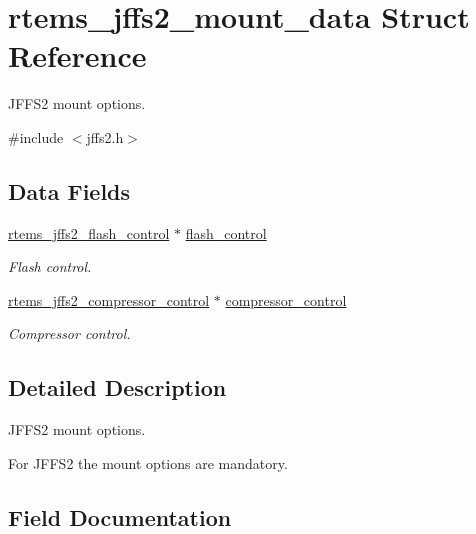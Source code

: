 \hypertarget{structrtems__jffs2__mount__data}{}\section{rtems\+\_\+jffs2\+\_\+mount\+\_\+data Struct Reference}
\label{structrtems__jffs2__mount__data}


J\+F\+F\+S2 mount options.  




{\ttfamily \#include $<$jffs2.\+h$>$}

\subsection*{Data Fields}
\begin{DoxyCompactItemize}
\item 
\mbox{\label{structrtems__jffs2__mount__data_a999ba6b5fd33ad5f0c77b9805e102bf5}} 
\mbox{\hyperlink{structrtems__jffs2__flash__control}{rtems\+\_\+jffs2\+\_\+flash\+\_\+control}} $\ast$ \mbox{\hyperlink{structrtems__jffs2__mount__data_a999ba6b5fd33ad5f0c77b9805e102bf5}{flash\+\_\+control}}
\begin{DoxyCompactList}\small\item\em Flash control. \end{DoxyCompactList}\item 
\mbox{\hyperlink{structrtems__jffs2__compressor__control}{rtems\+\_\+jffs2\+\_\+compressor\+\_\+control}} $\ast$ \mbox{\hyperlink{structrtems__jffs2__mount__data_a254dd630a41ba36dca210d051331281c}{compressor\+\_\+control}}
\begin{DoxyCompactList}\small\item\em Compressor control. \end{DoxyCompactList}\end{DoxyCompactItemize}


\subsection{Detailed Description}
J\+F\+F\+S2 mount options. 

For J\+F\+F\+S2 the mount options are mandatory. 

\subsection{Field Documentation}
\mbox{\label{structrtems__jffs2__mount__data_a254dd630a41ba36dca210d051331281c}} 
